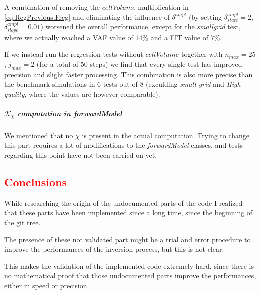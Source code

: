 \documentclass[10pt,a4paper]{article}
\begin{document}
{A combination of removing the $cellVolume$ multiplication in \eqref{eq:RegPrevious.Freg} and eliminating the influence of $\delta^{ampl}$ (by setting $\delta^{ampl}_{start}=2$, $\delta^{ampl}_{slope}=0.01$) worsened the overall performance, except for the \textit{smallgrid} test, where we actually reached a VAF value of $14\%$ and a FIT value of $7\%$.

If we instead run the regression tests without $cellVolume$ together with $n_{max} =25$, $j_{max} =2$ (for a total of 50 steps) we find that every single test has improved precision and slight faster processing.
This combination is also more precise than the benchmark simulations in 6 tests out of 8 (exculding \textit{small grid} and \textit{High quality}, where the values are however comparable).

\subparagraph*{$\mathcal{K}_\chi$ computation in \textit{forwardModel}}
We mentioned that no $\chi$ is present in the actual computation. Trying to change this part requires a lot of modifications to the \textit{forwardModel} classes, and tests regarding this point have not been carried on yet. 

\textcolor{red}
{\section{Conclusions}}
While researching the origin of the undocumented parts of the code I realized that these parts have been implemented since a long time, since the beginning of the git tree. 

The presence of these not validated part might be a trial and error procedure to improve the performances of the inversion process, but this is not clear.




This makes the validation of the implemented code extremely hard, since there is no mathematical proof that those undocumented parts improve the performances, either in speed or precision.

}
\end{document}

